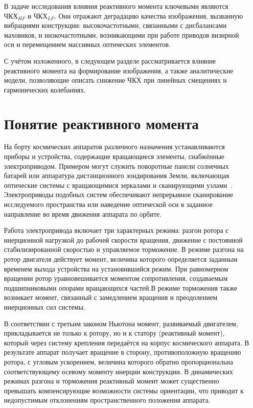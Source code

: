 В задаче исследования влияния реактивного момента ключевыми являются \(\text{ЧКХ}_{HF}\) и \(\text{ЧКХ}_{LF}\). Они отражают деградацию качества изображения, вызванную вибрациями конструкции: высокочастотными, связанными с дисбалансами маховиков, и низкочастотными, возникающими при работе приводов визирной оси и перемещением массивных оптических элементов.

С учётом изложенного, в следующем разделе рассматривается влияние реактивного момента на формирование  изображения, а также аналитические модели, позволяющие описать снижение ЧКХ при линейных смещениях и гармонических колебаниях.

	




\section{Понятие реактивного момента}

На борту космических аппаратов различного назначения устанавливаются приборы и устройства, содержащие вращающиеся элементы, снабжённые электроприводом. Примером могут служить поворотные панели солнечных батарей или аппаратура дистанционного зондирования Земли, включающая оптические системы с вращающимися зеркалами и сканирующими узлами~\cite{Pantenkov2022}. Электроприводы подобных систем обеспечивают непрерывное сканирование исследуемого пространства или наведение оптической оси в заданное направление во время движения аппарата по орбите.

Работа электропривода включает три характерных режима: разгон ротора с инерционной нагрузкой до рабочей скорости вращения, движение с постоянной стабилизированной скоростью и управляемое торможение. В режиме разгона на ротор двигателя действует момент, величина которого определяется заданным временем выхода устройства на установившийся режим. При равномерном вращении ротор уравновешивается моментом сопротивления, создаваемым подшипниковыми опорами вращающихся частей.В режиме торможения также возникает момент, связанный с замедлением вращения и преодолением инерционных сил системы.

В соответствии с третьим законом Ньютона момент, развиваемый двигателем, прикладывается не только к ротору, но и к статору (реактивный момент), который через систему крепления передаётся на корпус космического аппарата. В результате аппарат получает вращение в сторону, противоположную вращению ротора, с угловым ускорением, величина которого обратно пропорциональна соответствующему осевому моменту инерции конструкции. В динамических режимах разгона и торможения реактивный момент может существенно превышать компенсирующие возможности системы ориентации, что приводит к недопустимым отклонениям пространственного положения аппарата.


